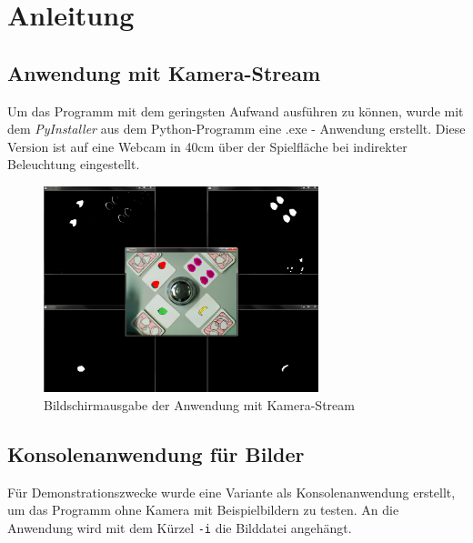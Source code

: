
\section{Anleitung}
\label{sec:Anleitung}

\subsection{Anwendung mit Kamera-Stream}
Um das Programm mit dem geringsten Aufwand ausführen zu können, wurde mit dem \emph{PyInstaller} aus dem Python-Programm eine .exe - Anwendung erstellt. Diese Version ist auf eine Webcam in 40cm über der Spielfläche bei indirekter Beleuchtung eingestellt. 
\begin{figure}[H]
    \centering
    \includegraphics[width=8cm]{Abbildungen/HalliGalli01}
    \caption[Aus]{Bildschirmausgabe der Anwendung mit Kamera-Stream}
    \label{fig:Ausgabe}
\end{figure}

\subsection{Konsolenanwendung für Bilder}
Für Demonstrationszwecke wurde eine Variante als Konsolenanwendung erstellt, um das Programm ohne Kamera mit Beispielbildern zu testen. 
An die Anwendung wird mit dem Kürzel \lstinline{-i} die Bilddatei angehängt.
 
